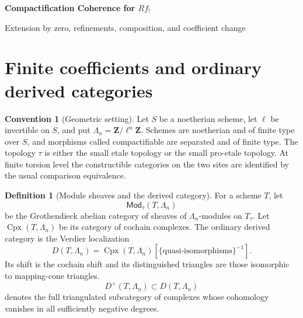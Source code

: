 \documentclass[10pt]{article}
\theoremstyle{definition}
\newtheorem{definition}[theorem]{Definition}
\newtheorem{convention}[theorem]{Convention}
\newcommand{\Mod}{\mathsf{Mod}}
\begin{document}
\begin{center}
{\large\bfseries Compactification Coherence for \(Rf_!\)\par}
\medskip
{\normalsize Extension by zero, refinements, composition, and coefficient change\par}
\end{center}

\begin{abstract}
The exceptional direct image is constructed from finite-torsion sheaves,
proper direct image, and compactifications.  Extension by zero begins with
the closed-support condition and passes through exactness to the Verdier
localization.  Dense refinements give compactification independence,
composition, units, and associativity.  Normalized adic systems,
central localization, and idempotent completion then supply the l-adic
coefficient categories.  Every derived category below is an ordinary
triangulated category.
\end{abstract}

\tableofcontents

\section{Finite coefficients and ordinary derived categories}

\begin{convention}[Geometric setting]
Let \(S\) be a noetherian scheme, let \(\ell\) be invertible on \(S\), and
put \(\Lambda_n=\mathbf Z/\ell^n\mathbf Z\).  Schemes are noetherian and of
finite type over \(S\), and morphisms called compactifiable are separated
and of finite type.  The topology \(\tau\) is either the small etale topology
or the small pro-etale topology.  At finite torsion level the constructible
categories on the two sites are identified by the usual comparison
equivalence.
\end{convention}

\begin{definition}[Module sheaves and the derived category]
For a scheme \(T\), let
\[
 \Mod_\tau(T,\Lambda_n)
\]
be the Grothendieck abelian category of sheaves of
\(\Lambda_n\)-modules on \(T_\tau\).  Let
\(\operatorname{Cpx}(T,\Lambda_n)\) be its category of cochain complexes.
The ordinary derived category is the Verdier localization
\[
 D(T,\Lambda_n)=
 \operatorname{Cpx}(T,\Lambda_n)
 [\{\text{quasi-isomorphisms}\}^{-1}].
\]
Its shift is the cochain shift and its distinguished triangles are those
isomorphic to mapping-cone triangles.
\[
 D^+(T,\Lambda_n)\subset D(T,\Lambda_n)
\]
denotes the full triangulated subcategory of complexes whose cohomology
vanishes in all sufficiently negative degrees.
\end{definition}
\end{document}
